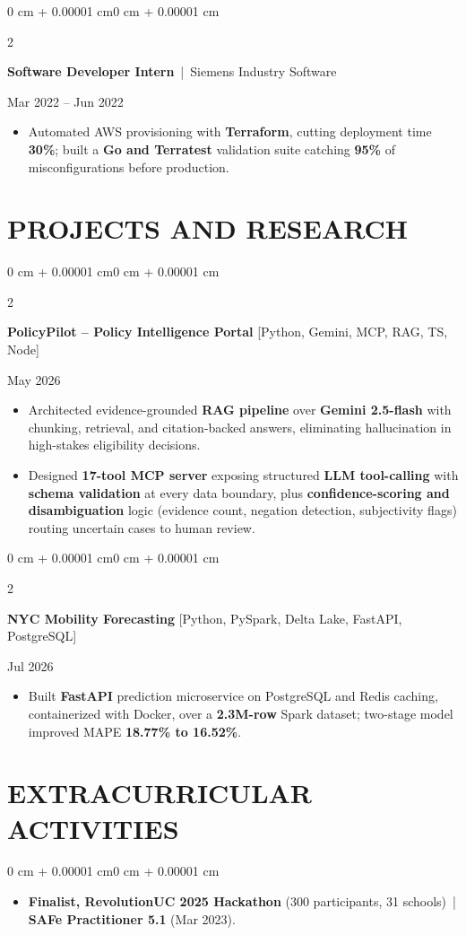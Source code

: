\documentclass[10pt, letterpaper]{article}
\newenvironment{highlights}{
    \begin{itemize}[
        topsep=0.10 cm,
        parsep=0.06 cm,
        partopsep=0pt,
        itemsep=0.06 cm,
        leftmargin=12pt
    ]
}{
    \end{itemize}
}
\newenvironment{onecolentry}{
    \begin{adjustwidth}{0 cm + 0.00001 cm}{0 cm + 0.00001 cm}
}{
    \end{adjustwidth}
}
\newenvironment{twocolentry}[2][]{
    \onecolentry
    \def\secondColumn{#2}
    \setcolumnwidth{\fill, 4.5 cm}
    \begin{paracol}{2}
}{
    \switchcolumn \raggedleft \secondColumn
    \end{paracol}
    \endonecolentry
}
\begin{document}
\vspace{0.15 cm}

\begin{twocolentry}{Mar 2022 -- Jun 2022}
\textbf{Software Developer Intern} \,|\, Siemens Industry Software
\end{twocolentry}
\begin{highlights}
  \item Automated AWS provisioning with \textbf{Terraform}, cutting deployment time \textbf{30\%}; built a \textbf{Go and Terratest} validation suite catching \textbf{95\%} of misconfigurations before production.
\end{highlights}

\section{PROJECTS AND RESEARCH}
\begin{twocolentry}{May 2026}
\textbf{PolicyPilot -- Policy Intelligence Portal} [Python, Gemini, MCP, RAG, TS, Node]
\end{twocolentry}
\begin{highlights}
  \item Architected evidence-grounded \textbf{RAG pipeline} over \textbf{Gemini 2.5-flash} with chunking, retrieval, and citation-backed answers, eliminating hallucination in high-stakes eligibility decisions.
  \item Designed \textbf{17-tool MCP server} exposing structured \textbf{LLM tool-calling} with \textbf{schema validation} at every data boundary, plus \textbf{confidence-scoring and disambiguation} logic (evidence count, negation detection, subjectivity flags) routing uncertain cases to human review.
\end{highlights}

\vspace{0.12 cm}

\begin{twocolentry}{Jul 2026}
\textbf{NYC Mobility Forecasting} [Python, PySpark, Delta Lake, FastAPI, PostgreSQL]
\end{twocolentry}
\begin{highlights}
  \item Built \textbf{FastAPI} prediction microservice on PostgreSQL and Redis caching, containerized with Docker, over a \textbf{2.3M-row} Spark dataset; two-stage model improved MAPE \textbf{18.77\% to 16.52\%}.
\end{highlights}

\section{EXTRACURRICULAR ACTIVITIES}
\begin{onecolentry}
\begin{highlights}
  \item \textbf{Finalist, RevolutionUC 2025 Hackathon} (300 participants, 31 schools) \,|\, \textbf{SAFe Practitioner 5.1} (Mar 2023).
\end{highlights}
\end{onecolentry}
\end{document}
